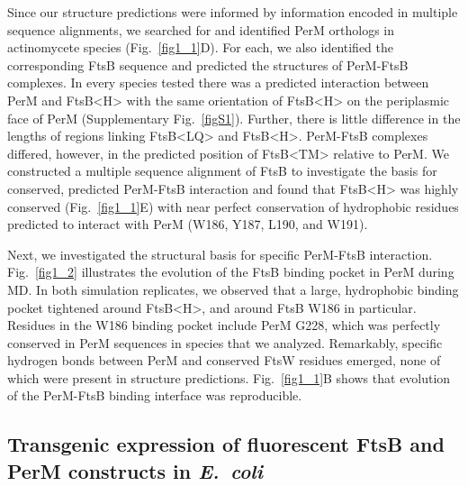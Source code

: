 \documentclass[twocolumn,pdflatex,sn-nature]{sn-jnl}%
\def\textsuperscript#1{<#1>}%
\newcommand\ec{\textit{E.~coli}}
\newcommand\ftsbTM{FtsB\textsuperscript{TM}}
\newcommand\ftsbLQ{FtsB\textsuperscript{LQ}}
\newcommand\ftsbH{FtsB\textsuperscript{H}}
\begin{document}
Since our structure predictions were informed by information encoded in multiple sequence alignments, we searched for and identified PerM orthologs in actinomycete species (Fig.~\ref{fig1_1}D).
For each, we also identified the corresponding FtsB sequence and predicted the structures of PerM-FtsB complexes.
In every species tested there was a predicted interaction between PerM and \ftsbH{} with the same orientation of \ftsbH{} on the periplasmic face of PerM (Supplementary Fig.~\ref{figS1}).
Further, there is little difference in the lengths of regions linking \ftsbLQ{} and \ftsbH{}.
PerM-FtsB complexes differed, however, in the predicted position of \ftsbTM{} relative to PerM.
We constructed a multiple sequence alignment of FtsB to investigate the basis for conserved, predicted PerM-FtsB interaction and found that \ftsbH{} was highly conserved (Fig.~\ref{fig1_1}E) with near perfect conservation of hydrophobic residues predicted to interact with PerM (W186, Y187, L190, and W191).

Next, we investigated the structural basis for specific PerM-FtsB interaction. Fig.~\ref{fig1_2} illustrates the evolution of the FtsB binding pocket in PerM during MD.
In both simulation replicates, we observed that a large, hydrophobic binding pocket tightened around \ftsbH{}, and around FtsB W186 in particular. 
Residues in the W186 binding pocket include PerM G228, which was perfectly conserved in PerM sequences in species that we analyzed.
Remarkably, specific hydrogen bonds between PerM and conserved FtsW residues emerged, none of which were present in structure predictions.
Fig.~\ref{fig1_1}B shows that evolution of the PerM-FtsB binding interface was reproducible.

\subsection{Transgenic expression of fluorescent FtsB and PerM constructs in \ec{}}
\end{document}
